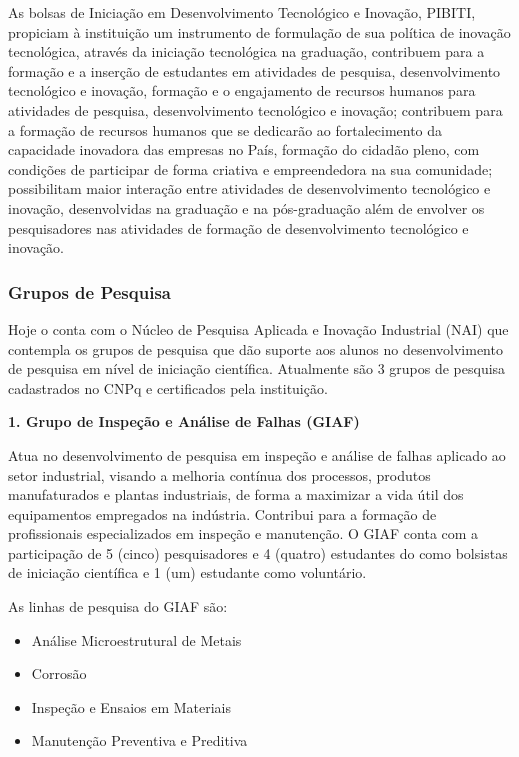 \documentclass{paper}
\begin{document}
As bolsas de Iniciação em Desenvolvimento Tecnológico e Inovação, PIBITI, propiciam à instituição um instrumento de formulação de sua política de inovação tecnológica, através da iniciação tecnológica na graduação, contribuem para a formação e a inserção de estudantes em atividades de pesquisa, desenvolvimento tecnológico e inovação, formação e o engajamento de recursos humanos para atividades de pesquisa, desenvolvimento tecnológico e inovação; contribuem para a formação de recursos humanos que se dedicarão ao fortalecimento da capacidade inovadora das empresas no País, formação do cidadão pleno, com condições de participar de forma criativa e empreendedora na sua comunidade; possibilitam maior interação entre atividades de desenvolvimento tecnológico e inovação, desenvolvidas na graduação e na pós-graduação além de envolver os pesquisadores nas atividades de formação de desenvolvimento tecnológico e inovação.

\subsubsection{Grupos de Pesquisa}

Hoje o \NOMECURSO conta com o Núcleo de Pesquisa Aplicada e Inovação Industrial (NAI)
que contempla os grupos de pesquisa que dão suporte aos alunos no desenvolvimento de pesquisa em nível de iniciação científica. Atualmente são 3 grupos de pesquisa cadastrados no CNPq e certificados pela instituição.

\vspace{0.5cm}

\noindent \textbf{1. Grupo de Inspeção e Análise de Falhas (GIAF)}

Atua no desenvolvimento de pesquisa em inspeção e análise de falhas aplicado ao setor industrial, visando a melhoria contínua dos processos, produtos manufaturados e plantas industriais, de forma a maximizar a vida útil dos equipamentos empregados na indústria. Contribui para a formação de profissionais especializados em inspeção e manutenção. O GIAF conta com a participação de 5 (cinco) pesquisadores e 4 (quatro) estudantes do \NOMECURSO como bolsistas de iniciação científica e 1 (um) estudante como voluntário.

As linhas de pesquisa do GIAF são:
\begin{itemize}
\item Análise Microestrutural de Metais
\item Corrosão
\item Inspeção e Ensaios em Materiais
\item Manutenção Preventiva e Preditiva
\end{itemize}
\end{document}
